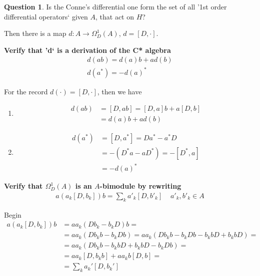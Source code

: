 \documentclass[a4paper]{article}
\newcounter{exercise}
\newenvironment{MyExercise}%
{\begin{mdframed}[style=exercisestyle]}{\end{mdframed}}
\theoremstyle{definition}
\theoremstyle{definition}
\newtheorem{question}{Question}
\theoremstyle{definition}
\theoremstyle{theorem}
\theoremstyle{theorem}
\begin{document}
\begin{question}
    Is the Conne's differential one form  the set of all '1st order
    differential operators` given $A$, that act on $H$?
\end{question}
Then there is a map $d:A\rightarrow \Omega _D ^1 (A)$, $d = [D, \cdot]$.
\begin{MyExercise}
    \textbf{
    Verify that 'd` is a derivation of the C* algebra
    \begin{align*}
        d(ab) = d(a)b + ad(b) \\
        d(a^*) = -d(a)^*
    \end{align*}
}\newline

    For the record $d(\cdot) = [D, \cdot]$, then we have
    \begin{enumerate}
        \item
            \begin{align*}
                d(ab) &= [D, ab] = [D, a]b + a[D,b]\\
                &= d(a)b + ad(b)
            \end{align*}
        \item
            \begin{align*}
                d(a^*) &= [D, a^*] = Da^* - a^*D \\
                &=-(D^*a - aD^*) = -[D^*, a] \\
                &= -d(a)^*
            \end{align*}
    \end{enumerate}
\end{MyExercise}
\begin{MyExercise}
    \textbf{
    Verify that $\Omega _D^1 (A)$ is an $A$-bimodule by rewriting
    }
    \begin{align*}
        a(a_k[D, b_k])b = \sum_k a'_k[D, b'_k] \;\;\;\; a'_k, b'_k \in A
    \end{align*}
    \newline

    Begin
    \begin{align*}
        a(a_k[D, b_k])b &= aa_k(Db_k - b_k D) b = \\
           &= aa_k(Db_k b - b_k D b) = aa_k(Db_k b - b_k Db - b_kbD +b_kbD)=\\
           &= aa_k(Db_kb-b_kbD + b_k b D - b_k D b) = \\
           &= aa_k [D, b_kb] + aa_k b [D, b]=\\
           &= \sum _k a_k' [D, b_k']
    \end{align*}

\end{MyExercise}
\end{document}
